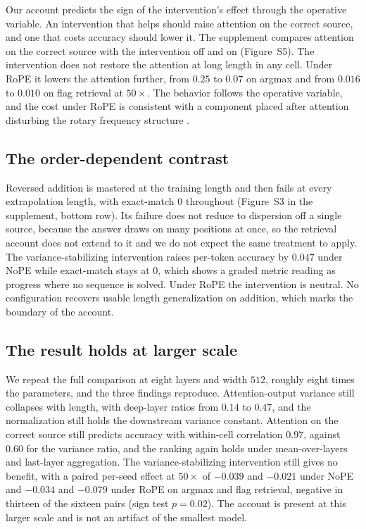 \documentclass[letterpaper]{article} %
\begin{document}
Our account predicts the sign of the intervention's effect through the operative variable.
An intervention that helps should raise attention on the correct source, and one that costs accuracy should
lower it.
The supplement compares attention on the correct source with the intervention off and on (Figure~S5).
The intervention does not restore the attention at long length in any cell.
Under RoPE it lowers the attention further, from $0.25$ to $0.07$ on argmax and from $0.016$ to $0.010$ on
flag retrieval at $50\times$.
The behavior follows the operative variable, and the cost under RoPE is consistent with a component placed
after attention disturbing the rotary frequency structure \citep{fope}.

\subsection{The order-dependent contrast}
\label{sec:res-addition}

Reversed addition is mastered at the training length and then fails at every extrapolation length, with
exact-match $0$ throughout (Figure~S3 in the supplement, bottom row).
Its failure does not reduce to dispersion off a single source, because the answer draws on many positions
at once, so the retrieval account does not extend to it and we do not expect the same treatment to apply.
The variance-stabilizing intervention raises per-token accuracy by $0.047$ under NoPE while exact-match
stays at $0$, which shows a graded metric reading as progress where no sequence is solved.
Under RoPE the intervention is neutral.
No configuration recovers usable length generalization on addition, which marks the boundary of the account.

\subsection{The result holds at larger scale}
\label{sec:res-scale}

We repeat the full comparison at eight layers and width $512$, roughly eight times the parameters, and the
three findings reproduce.
Attention-output variance still collapses with length, with deep-layer ratios from $0.14$ to $0.47$, and the
normalization still holds the downstream variance constant.
Attention on the correct source still predicts accuracy with within-cell correlation $0.97$, against $0.60$
for the variance ratio, and the ranking again holds under mean-over-layers and last-layer aggregation.
The variance-stabilizing intervention still gives no benefit, with a paired per-seed effect at $50\times$ of
$-0.039$ and $-0.021$ under NoPE and $-0.034$ and $-0.079$ under RoPE on argmax and flag retrieval, negative
in thirteen of the sixteen pairs (sign test $p=0.02$).
The account is present at this larger scale and is not an artifact of the smallest model.
\end{document}
